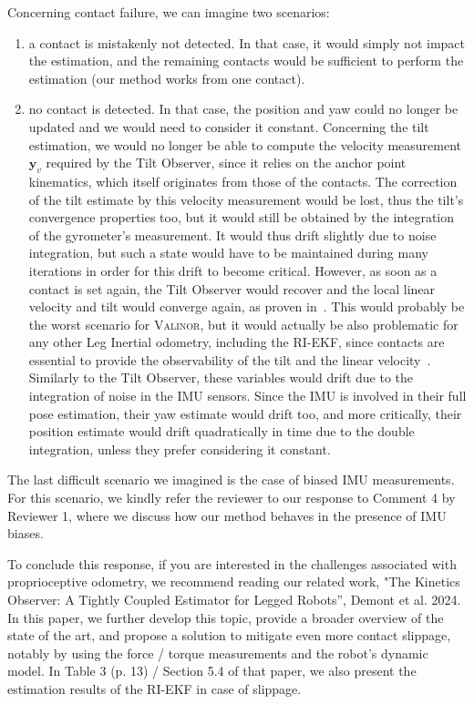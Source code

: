 Concerning contact failure, we can imagine two scenarios:
\begin{enumerate}
    \item a contact is mistakenly not detected. In that case, it would simply not impact the estimation, and the remaining contacts would be sufficient to perform the estimation (our method works from one contact).
    \item no contact is detected. In that case, the position and yaw could no longer be updated and we would need to consider it constant. Concerning the tilt estimation, we would no longer be able to compute the velocity measurement $\boldsymbol{y}_v$ required by the Tilt Observer, since it relies on the anchor point kinematics, which itself originates from those of the contacts. The correction of the tilt estimate by this velocity measurement would be lost, thus the tilt's convergence properties too, but it would still be obtained by the integration of the gyrometer's measurement. It would thus drift slightly due to noise integration, but such a state would have to be maintained during many iterations in order for this drift to become critical. However, as soon as a contact is set again, the Tilt Observer would recover and the local linear velocity and tilt would converge again, as proven in~\cite{benallegue2020LyapunovStableOrientationEstimatorHumanoids}.
    This would probably be the worst scenario for {\scshape Valinor}, but it would actually be also problematic for any other Leg Inertial odometry, including the RI-EKF, since contacts are essential to provide the observability of the tilt and the linear velocity~\cite{bloesch2013FusionLegKineAndImu}. Similarly to the Tilt Observer, these variables would drift due to the integration of noise in the IMU sensors. Since the IMU is involved in their full pose estimation, their yaw estimate would drift too, and more critically, their position estimate would drift quadratically in time due to the double integration, unless they prefer considering it constant.
\end{enumerate}

The last difficult scenario we imagined is the case of biased IMU measurements. For this scenario, we kindly refer the reviewer to our response to Comment 4 by Reviewer 1, where we discuss how our method behaves in the presence of IMU biases.

To conclude this response, if you are interested in the challenges associated with proprioceptive odometry, we recommend reading our related work, "The Kinetics Observer: A Tightly Coupled Estimator for Legged Robots”, Demont et al. 2024. In this paper, we further develop this topic, provide a broader overview of the state of the art, and propose a solution to mitigate even more contact slippage, notably by using the force / torque measurements and the robot's dynamic model. In Table 3 (p. 13) / Section 5.4 of that paper, we also present the estimation results of the RI-EKF in case of slippage.



